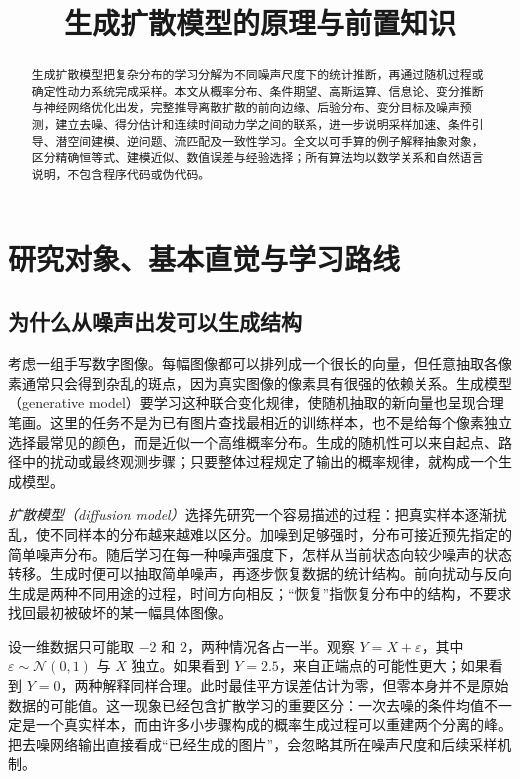 \documentclass[UTF8,12pt,a4paper,fontset=fandol]{ctexart}
\title{生成扩散模型的原理与前置知识}
\author{}
\date{}
\begin{document}
\maketitle
\begin{abstract}
生成扩散模型把复杂分布的学习分解为不同噪声尺度下的统计推断，再通过随机过程或确定性动力系统完成采样。本文从概率分布、条件期望、高斯运算、信息论、变分推断与神经网络优化出发，完整推导离散扩散的前向边缘、后验分布、变分目标及噪声预测，建立去噪、得分估计和连续时间动力学之间的联系，进一步说明采样加速、条件引导、潜空间建模、逆问题、流匹配及一致性学习。全文以可手算的例子解释抽象对象，区分精确恒等式、建模近似、数值误差与经验选择；所有算法均以数学关系和自然语言说明，不包含程序代码或伪代码。
\end{abstract}
\tableofcontents

\section{研究对象、基本直觉与学习路线}
\label{sec:diff-intro}
\subsection{为什么从噪声出发可以生成结构}
考虑一组手写数字图像。每幅图像都可以排列成一个很长的向量，但任意抽取各像素通常只会得到杂乱的斑点，因为真实图像的像素具有很强的依赖关系。生成模型（generative model）要学习这种联合变化规律，使随机抽取的新向量也呈现合理笔画。这里的任务不是为已有图片查找最相近的训练样本，也不是给每个像素独立选择最常见的颜色，而是近似一个高维概率分布。生成的随机性可以来自起点、路径中的扰动或最终观测步骤；只要整体过程规定了输出的概率规律，就构成一个生成模型。

\emph{扩散模型（diffusion model）}选择先研究一个容易描述的过程：把真实样本逐渐扰乱，使不同样本的分布越来越难以区分。加噪到足够强时，分布可接近预先指定的简单噪声分布。随后学习在每一种噪声强度下，怎样从当前状态向较少噪声的状态转移。生成时便可以抽取简单噪声，再逐步恢复数据的统计结构。前向扰动与反向生成是两种不同用途的过程，时间方向相反；“恢复”指恢复分布中的结构，不要求找回最初被破坏的某一幅具体图像。

设一维数据只可能取 $-2$ 和 $2$，两种情况各占一半。观察 $Y=X+\varepsilon$，其中 $\varepsilon\sim\mathcal N(0,1)$ 与 $X$ 独立。如果看到 $Y=2.5$，来自正端点的可能性更大；如果看到 $Y=0$，两种解释同样合理。此时最佳平方误差估计为零，但零本身并不是原始数据的可能值。这一现象已经包含扩散学习的重要区分：一次去噪的条件均值不一定是一个真实样本，而由许多小步骤构成的概率生成过程可以重建两个分离的峰。把去噪网络输出直接看成“已经生成的图片”，会忽略其所在噪声尺度和后续采样机制。
\end{document}
